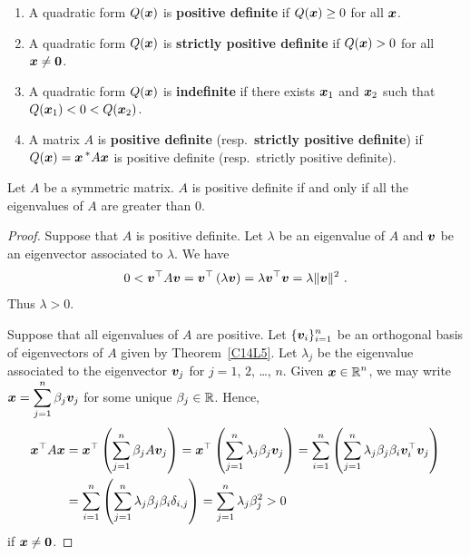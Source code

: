 \begin{defn}
\begin{enumerate}
\item A quadratic form $Q(\bm{x})$ is
{\bfseries positive definite}
if $Q(\bm{x}) \geq 0$ for all $\bm{x}$. 
\item A quadratic form $Q(\bm{x})$ is
{\bfseries strictly positive definite} if $Q(\bm{x}) > 0$ for all $\bm{x} \neq \bm{0}$.
\item A quadratic form $Q(\bm{x})$ is
{\bfseries indefinite} if there
exists $\bm{x}_1$ and $\bm{x}_2$ such that
$Q(\bm{x}_1) < 0 < Q(\bm{x}_2)$. 
\item A \nn matrix $A$ is
{\bfseries positive definite}
(resp.\ {\bfseries strictly positive definite}) if $\displaystyle Q(\bm{x}) = \bm{x}\,^\ast A \bm{x}$ is
positive definite (resp.\ strictly positive definite).
\end{enumerate}
\end{defn}

\begin{theorem}
Let $A$ be a \nn symmetric matrix.  $A$ is positive definite if and
only if all the eigenvalues of $A$ are greater than 0.
\end{theorem}

\begin{proof}
 Suppose that $A$ is positive definite.  Let $\lambda$ be an
eigenvalue of $A$ and $\bm{v}$ be an eigenvector associated to $\lambda$. We
have
\[
0 < \bm{v}^\top A \bm{v} = \bm{v}^\top \left( \lambda \bm{v}\right) =
\lambda \bm{v}^\top \bm{v} = \lambda \|\bm{v}\|^2 \  .
\]
Thus $\lambda >0$.

 Suppose that all eigenvalues of $A$ are positive.
Let $\displaystyle \{\bm{v}_i\}_{i=1}^n$ be an orthogonal basis of
eigenvectors of $A$ given by Theorem~\ref{C14L5}.  Let $\lambda_j$ be
the eigenvalue associated to the eigenvector $\bm{v}_j$ for $j=1$, $2$,
\ldots, $n$.  Given $\displaystyle \bm{x} \in \mathbb{R}^n$, we may write
$\displaystyle \bm{x} = \sum_{j=1}^n \beta_j \bm{v}_j$ for some unique
$\beta_j \in \mathbb{R}$.  Hence,
\begin{align*}
\bm{x}^\top A \bm{x} &=
\bm{x}^\top \left( \sum_{j=1}^n \beta_j A \bm{v}_j \right)
= \bm{x}^\top \left( \sum_{j=1}^n \lambda_j \beta_j \bm{v}_j \right)
= \sum_{i=1}^n\left( \sum_{j=1}^n \lambda_j \beta_j \beta_i \bm{v}_i^\top
\bm{v}_j \right) \\
&= \sum_{i=1}^n\left(\sum_{j=1}^n \lambda_j \beta_j \beta_i \delta_{i,j}\right)
= \sum_{j=1}^n \lambda_j \beta_j^2 > 0
\end{align*}
if $\bm{x} \neq \bm{0}$.
\end{proof}

